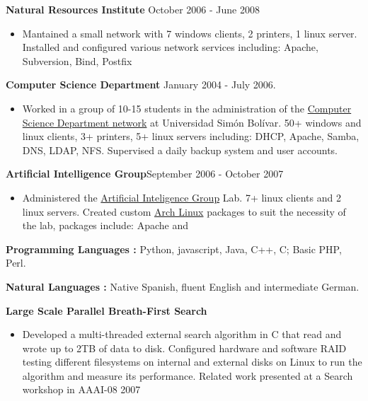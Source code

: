 \documentclass[10pt]{article}
\newcommand{\vitem}{\vspace*{-.4pc}\item}
\begin{document}
\noindent\textbf{Natural Resources Institute} \hfill October 2006 - June 2008
\begin{itemize}
\vitem Mantained a small network with 7 windows clients, 2 printers, 1
  linux server. Installed and configured various network services including:
  Apache, Subversion, Bind, Postfix
\end{itemize}

\noindent\textbf{Computer Science Department} \hfill January 2004 -
  July 2006.
\begin{itemize}
\vitem Worked in a group of 10-15 students in the administration of the
  \href{http://www.ldc.usb.ve}{Computer Science Department network}
  at Universidad Simón Bolívar. 50+ windows and linux clients, 3+
  printers, 5+ linux servers including: DHCP, Apache, Samba, DNS,
  LDAP, NFS. Supervised a daily backup system and user accounts.
\end{itemize}

\noindent\textbf{Artificial Intelligence Group}\hfill September 2006 - October 2007
\begin{itemize}
  \vitem Administered the \href{http://www.gia.usb.ve}{Artificial
    Inteligence Group} Lab. 7+ linux clients and 2 linux
  servers. Created custom \href{http://www.archlinux.org/}{Arch Linux}
  packages to suit the necessity of the lab, packages include: Apache
  and \LaTeXe{}
\end{itemize}

\flushleft\textbf{Programming Languages :} Python, javascript, Java,
C++, C; Basic PHP, Perl.

\noindent\textbf{Natural Languages :} Native Spanish, fluent English
and intermediate German.

\vspace{1pc}
\flushleft\textbf{Large Scale Parallel Breath-First Search}
\begin{itemize}
  \vitem Developed a multi-threaded external search algorithm in C
  that read and wrote up to 2TB of data to disk. Configured hardware and
  software RAID testing different filesystems on internal and external
  disks on Linux to run the algorithm and measure its
  performance. Related work presented at a Search workshop in AAAI-08
  \hfill 2007
\end{itemize}

\end{document}
